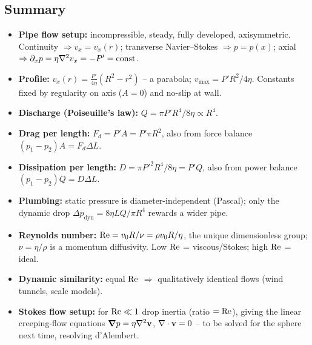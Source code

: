 \documentclass[../main.tex]{subfiles}
\begin{document}
\subsection*{Summary}
\begin{itemize}
  \item \textbf{Pipe flow setup:} incompressible, steady, fully developed, axisymmetric. Continuity $\Rightarrow v_x=v_x(r)$; transverse Navier--Stokes $\Rightarrow p=p(x)$; axial $\Rightarrow \partial_x p=\eta\nabla^2 v_x=-P'=\text{const}$.
  \item \textbf{Profile:} $v_x(r)=\tfrac{P'}{4\eta}(R^2-r^2)$ -- a parabola; $v_{\max}=P'R^2/4\eta$. Constants fixed by regularity on axis ($A=0$) and no-slip at wall.
  \item \textbf{Discharge (Poiseuille's law):} $Q=\pi P'R^4/8\eta\propto R^4$.
  \item \textbf{Drag per length:} $F_d=P'A=P'\pi R^2$, also from force balance $(p_1-p_2)A=F_d\Delta L$.
  \item \textbf{Dissipation per length:} $D=\pi P'^2R^4/8\eta=P'Q$, also from power balance $(p_1-p_2)Q=D\Delta L$.
  \item \textbf{Plumbing:} static pressure is diameter-independent (Pascal); only the dynamic drop $\Delta p_{\text{dyn}}=8\eta L Q/\pi R^4$ rewards a wider pipe.
  \item \textbf{Reynolds number:} $\mathrm{Re}=v_0R/\nu=\rho v_0 R/\eta$, the unique dimensionless group; $\nu=\eta/\rho$ is a momentum diffusivity. Low $\mathrm{Re}$ = viscous/Stokes; high $\mathrm{Re}$ = ideal.
  \item \textbf{Dynamic similarity:} equal $\mathrm{Re}$ $\Rightarrow$ qualitatively identical flows (wind tunnels, scale models).
  \item \textbf{Stokes flow setup:} for $\mathrm{Re}\ll1$ drop inertia (ratio $=\mathrm{Re}$), giving the linear creeping-flow equations $\grad p=\eta\nabla^2\mathbf{v}$, $\nabla \cdot\mathbf{v}=0$ -- to be solved for the sphere next time, resolving d'Alembert.
\end{itemize}
\end{document}
